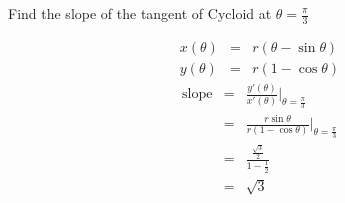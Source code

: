 \begin{eg}
Find the slope of the tangent of Cycloid at \(\displaystyle \theta = \frac{\pi}{3}\)

\soln
\[\begin{array}{rcl}
x(\theta) & = & r(\theta - \sin \theta)\\
y(\theta) & = & r(1 - \cos \theta)
\end{array}\]
\[\begin{array}{rcl}
\text{slope} & = & \displaystyle \frac{y'(\theta)}{x'(\theta)} \Big |_{\theta = \frac{\pi}{3}}\\
& = & \displaystyle \frac{r \sin \theta}{r(1 - \cos \theta)} \Big |_{\theta = \frac{\pi}{3}}\\
& = & \displaystyle \frac{\frac{\sqrt{3}}{2}}{1 - \frac{1}{2}}\\
& = & \sqrt{3}
\end{array}\]
\end{eg}
